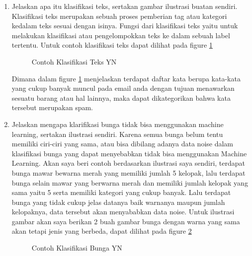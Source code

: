 \begin{enumerate}
\item Jelaskan apa itu klasifikasi teks, sertakan gambar ilustrasi buatan sendiri.
Klasifikasi teks merupakan sebuah proses pemberian tag atau kategori kedalam teks sesuai dengan isinya. Fungsi dari klasifikasi teks yaitu untuk melakukan klasifikasi atau pengelompokkan teks ke dalam sebuah label tertentu. Untuk contoh klasifikasi teks dapat dilihat pada figure \ref{YNC4-1}

	\begin{figure}[ht]
		\caption{Contoh Klasifikasi Teks YN}
		\label{YNC4-1}
	\end{figure}

Dimana dalam figure \ref{YNC4-1} menjelaskan terdapat daftar kata berupa kata-kata yang cukup banyak muncul pada email anda dengan tujuan menawarkan sesuatu barang atau hal lainnya, maka dapat dikategorikan bahwa kata tersebut merupakan spam.

\item Jelaskan mengapa klarifikasi bunga tidak bisa menggunakan machine learning, sertakan ilustrasi sendiri.
Karena semua bunga belum tentu memiliki ciri-ciri yang sama, atau bisa dibilang adanya data noise dalam klasifikasi bunga yang dapat menyebabkan tidak bisa menggunakan Machine Learning. Akan saya beri contoh berdasarkan ilustrasi saya sendiri, terdapat bunga mawar bewarna merah yang memiliki jumlah 5 kelopak, lalu terdapat bunga selain mawar yang  berwarna merah dan memiliki jumlah kelopak yang sama yaitu 5 serta memiliki kategori yang cukup banyak. Lalu terdapat bunga yang tidak cukup jelas datanya baik warnanya maupun jumlah kelopaknya, data tersebut akan menyababkan data noise. Untuk ilustrasi gambar akan saya berikan 2 buah gambar bunga dengan warna yang sama akan tetapi jenis yang berbeda, dapat dilihat pada figure \ref{YNC4-2}

	\begin{figure}[ht]
		\caption{Contoh Klasifikasi Bunga YN}
		\label{YNC4-2}
	\end{figure}


\end{enumerate}
